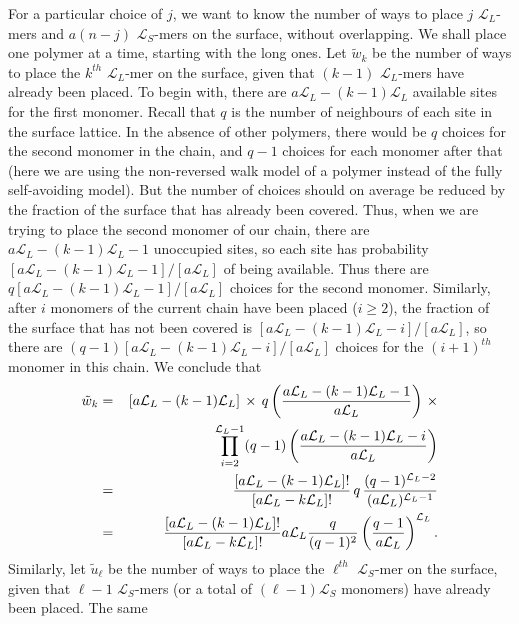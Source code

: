 \documentclass[journal=mamobx,manuscript=article]{achemso}
\newcommand{\leng}{\mathcal{L}}
\begin{document}
For a particular choice of $j$, we want to know the number of ways to place $j$ $\leng_L$-mers 
and $a(n-j)$ $\leng_S$-mers on the surface,
without overlapping.  %
We shall place one polymer at a time, starting with the long ones.
Let $\tilde{w}_k$ be the number of ways to place the $k^{th}$ $\leng_L$-mer on the surface, given that
$(k-1)$ $\leng_L$-mers have already been placed.  
To begin with, there are $a\leng_L-(k-1)\leng_L$ available sites for the first monomer.  Recall that  $q$ is the number of
neighbours of each site in the surface lattice.
In the absence of other polymers, there would be $q$ choices for the second monomer in the chain,
and $q-1$ choices for each monomer after that (here we are using the non-reversed walk model of a polymer
instead of the fully self-avoiding model).  But the number of choices should on average be reduced 
by the fraction of the surface that has already been covered.  
Thus, when we are trying to place the second monomer of our chain, there are
$a\leng_L-(k-1)\leng_L-1$ unoccupied sites, so each site has 
probability $[a\leng_L-(k-1)\leng_L-1]/[a\leng_L]$ of being available.  
Thus there are $q[a\leng_L-(k-1)\leng_L-1]/[a\leng_L]$ choices for the second monomer.  
Similarly, after $i$ monomers of the current chain have been placed ($i\geq 2$), the fraction of the
surface that has not been covered is $[a\leng_L-(k-1)\leng_L-i]/[a\leng_L]$, so there are 
$(q-1)[a\leng_L-(k-1)\leng_L-i]/[a\leng_L]$ choices for the $(i+1)^{th}$ monomer in this chain.  
We conclude that 
\begin{eqnarray}
   \tilde{w}_k  & = &   [a\leng_L-(k-1)\leng_L]\,\times \,q\left(\frac{ a\leng_L-(k-1)\leng_L-1}{a\leng_L}\right)    \,\times
   \nonumber    \\
   & &    \hspace{22mm}
     \prod_{i=2}^{\leng_L-1}(q-1)\left(\frac{ a\leng_L-(k-1)\leng_L-i}{a\leng_L}\right)  
      \nonumber \\
 & = &    \frac{[a\leng_L-(k-1)\leng_L]!}{[a\leng_L-k\leng_L]!} \,q\,  \frac{(q-1)^{\leng_L-2}}{(a\leng_L)^{\leng_L-1}}  
     \nonumber    \\
     & = &    \frac{[a\leng_L-(k-1)\leng_L]!}{[a\leng_L-k\leng_L]!}   a\leng_L \frac{q}{(q-1)^2}\left(  \frac{q-1}{a\leng_L}\right)^{\leng_L}.
     \label{eq.wk2supp}
\end{eqnarray}
Similarly, let $\tilde{u}_{\ell}$ be the number of ways to place the $\ell^{th}$ $\leng_S$-mer on the surface, given that
${\ell}-1$ $\leng_S$-mers (or a total of $(\ell-1)\leng_S$ monomers) have already been placed.   The same 
\end{document}
